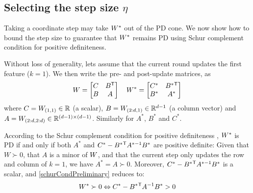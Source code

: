 \documentclass{article}
\begin{document}
{

\subsection{Selecting the step size $\eta$}
Taking a coordinate step may take ${{W^*}}$ out of the PD cone. We now
show how to bound the step size to guarantee that ${{W^*}}$ remains PD
using Schur complement condition for positive definiteness.

Without loss of generality, lets assume that the current round updates
the first feature ($k = 1$).  We then write the pre- and post-update
matrices, as
\begin{equation}
  {W} = \left[ \begin{matrix} C & B{}^\mathsf{T} \\ B & A \end{matrix} \right]
  \quad
  {{W^*}} = \left[ \begin{matrix} C^* & B^*{}^\mathsf{T} \\ B^* & A^* \end{matrix} \right]
  \label{schurNotationPreUpdate}
\end{equation}
where $C = {W}_{(1,1)} \in \mathbb{R}$ (a scalar), $B = {W}_{(2:d,1)} \in
\mathbb{R}^{d-1}$ (a column vector) and $A = {W}_{(2:d,2:d)} \in \mathbb{R}^{(d-1)
  \times (d-1)}$. Similarly for $A^*$, $B^*$ and $C^*$.

According to the Schur complement condition for positive definiteness
\citep[p. 650]{boyd2004convex}, ${{W^*}}$ is PD if and only if both
$A^*$ and $C^* - B^*{}^\mathsf{T} A^{*-1} B^*$ are positive definite:
Given that $W \succ 0$, that $A$ is a minor of ${W}$, and that the
current step only updates the row and column of $k=1$, we have $A^* =
A \succ 0$.  Moreover, $C^* - B^*{}^\mathsf{T} A^{*-1} B^*$ is a
scalar, and \eqref{schurCondPreliminary} reduces to:
\begin{equation}
  {W^*} \succ  0 \Leftrightarrow  C^* - B^*{}^\mathsf{T} A^{-1} B^* >  0
  \label{schurCond}
\end{equation}
%

}
\end{document}
